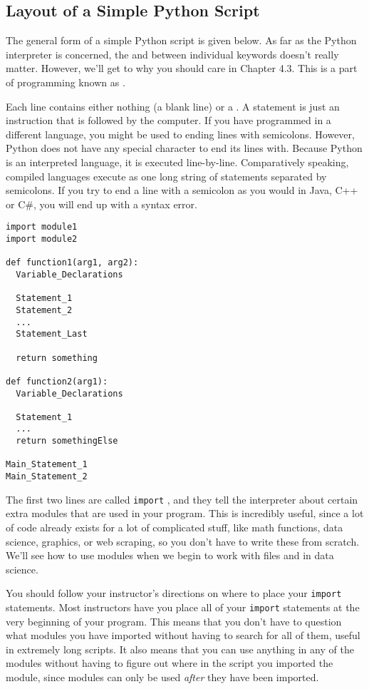 \subsection{Layout of a Simple Python Script}
The general form of a simple Python script is given below. As far as the Python interpreter is concerned, the  and  between individual keywords doesn't really matter. However, we'll get to why you should care in Chapter 4.3. This is a part of programming known as .\par
Each line contains either nothing (a blank line) or a . A statement is just an instruction that is followed by the computer. If you have programmed in a different language, you might be used to ending lines with semicolons. However, Python does not have any special character to end its lines with. Because Python is an interpreted language, it is executed line-by-line. Comparatively speaking, compiled languages execute as one long string of statements separated by semicolons. If you try to end a line with a semicolon as you would in Java, C++ or C\#, you will end up with a syntax error.\par
\begin{lstlisting}[style=pippython]
import module1
import module2

def function1(arg1, arg2):
  Variable_Declarations
  
  Statement_1
  Statement_2
  ...
  Statement_Last
  
  return something

def function2(arg1):
  Variable_Declarations
  
  Statement_1
  ...
  return somethingElse

Main_Statement_1
Main_Statement_2
\end{lstlisting}
The first two lines are called \verb|import| , and they tell the interpreter about certain extra modules that are used in your program. This is incredibly useful, since a lot of code already exists for a lot of complicated stuff, like math functions, data science, graphics, or web scraping, so you don't have to write these from scratch. We'll see how to use modules when we begin to work with files and in data science.\par
You should follow your instructor's directions on where to place your \verb|import| statements. Most instructors have you place all of your \verb|import| statements at the very beginning of your program. This means that you don't have to question what modules you have imported without having to search for all of them, useful in extremely long scripts. It also means that you can use anything in any of the modules without having to figure out where in the script you imported the module, since modules can only be used \textit{after} they have been imported.\par
